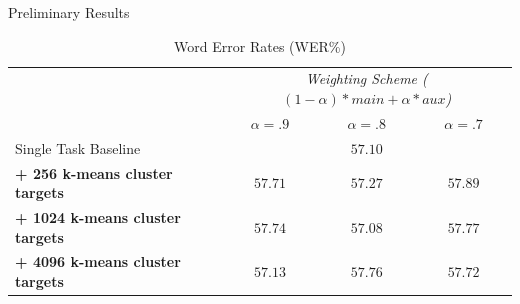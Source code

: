 \documentclass[final]{beamer} %
\begin{document}
\begin{frame}
\begin{columns}
\begin{column}{0.22\textwidth}
{        \begin{block}{\boxnumber Preliminary Results}
          \begin{table}[!htbp]
            \centering
            \caption{Word Error Rates (WER\%)}
            \label{tab:results}
            \begin{adjustbox}{width=.9\textwidth}
              \begin{tabular}{lccc}
                \toprule
                & \multicolumn{3}{c}{ \textit{Weighting Scheme ($(1-\alpha)*main + \alpha*aux$)}}\\
                & $\alpha = .9 $ & $\alpha = .8 $ & $\alpha = .7 $\\
                \midrule
                Single Task Baseline  &  \multicolumn{3}{c}{$57.10 $ \raisebox{.33\height}{\footnotesize{$\pm 3.25$}}}     \\
                \textbf{+ 256 k-means cluster targets}  &  $57.71 $ \raisebox{.33\height}{\footnotesize{$\pm 1.59$}}   &  $57.27 $ \raisebox{.33\height}{\footnotesize{$\pm 1.60$}}     & $57.89 $ \raisebox{.33\height}{\footnotesize{$\pm 1.29$}} \\
                \textbf{+ 1024 k-means cluster targets}   & $57.74 $ \raisebox{.33\height}{\footnotesize{$\pm 3.17$}}    & $57.08 $ \raisebox{.33\height}{\footnotesize{$ \pm 2.62$}}    & $57.77 $ \raisebox{.33\height}{\footnotesize{$\pm .79$}}  \\
                \textbf{+ 4096 k-means cluster targets}   &  $57.13 $ \raisebox{.33\height}{\footnotesize{$\pm 2.45$}}  & $57.76 $ \raisebox{.33\height}{\footnotesize{$\pm 1.61 $}}   &   $57.72 $ \raisebox{.33\height}{\footnotesize{$\pm .64$}}  \\
                \midrule
                \bottomrule
              \end{tabular}
            \end{adjustbox}
          \end{table}
        \end{block}

        
        \vspace{.5cm}


}
\end{column}
\end{columns}
\end{frame}
\end{document}
